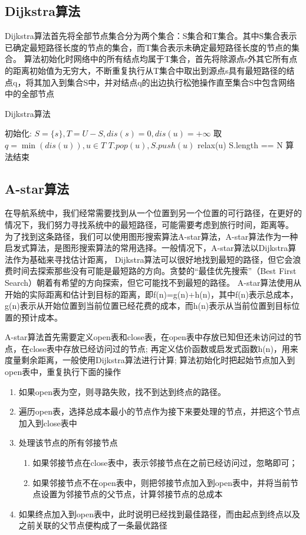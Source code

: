 \subsection*{Dijkstra算法}
Dijkstra算法首先将全部节点集合分为两个集合：S集合和T集合。其中S集合表示已确定最短路径长度的节点的集合，而T集合表示未确定最短路径长度的节点的集合。
算法初始化时网络中的所有结点均属于T集合，首先将除源点s外其它所有点的距离初始值为无穷大，不断重复执行从T集合中取出到源点s具有最短路径的结点q，将其加入到集合S中，并对结点q的出边执行松弛操作直至集合S中包含网络中的全部节点


\begin{algorithm}
    \caption{Dijkstra算法}
    \begin{algorithmic}[1]
        \STATE 初始化: $S = \{s\}, T = U - S, dis(s)=0, dis(u)=+\infty$
        \REPEAT
        \STATE 取$q=\min(dis(u)), u \in T$
        \STATE $T.pop(u), S.push(u)$
        \STATE relax(u)
        \UNTIL S.length == N
        \STATE 算法结束
    \end{algorithmic}\label{alg:algorithm}
\end{algorithm}

\subsection*{A-star算法}
在导航系统中，我们经常需要找到从一个位置到另一个位置的可行路径，在更好的情况下，我们努力寻找系统中的最短路径，可能需要考虑到旅行时间，距离等。
为了找到这条路径，我们可以使用图形搜索算法A-star算法，A-star算法作为一种启发式算法，是图形搜索算法的常用选择。一般情况下，A-star算法以Dijkstra算法作为基础来寻找估计距离，
Dijkstra算法可以很好地找到最短的路径，但它会浪费时间去探索那些没有可能是最短路的方向。贪婪的“最佳优先搜索”（Best First Search）朝着有希望的方向探索，但它可能找不到最短的路径。
A-star算法使用从开始的实际距离和估计到目标的距离，即f(n)=g(n)+h(n)，其中f(n)表示总成本，g(n)表示从开始位置到当前位置已经花费的成本，而h(n)表示从当前位置到目标位置的预计成本。

A-star算法首先需要定义open表和close表，在open表中存放已知但还未访问过的节点，在close表中存放已经访问过的节点;
再定义估价函数或启发式函数h(n)，用来度量剩余距离，一般使用Dijkstra算法进行计算;
算法初始化时把起始节点加入到open表中，重复执行下面的操作
\begin{enumerate}%
    \item 如果open表为空，则寻路失败，找不到达到终点的路径。
    \item 遍历open表，选择总成本最小的节点作为接下来要处理的节点，并把这个节点加入到close表中
    \item 处理该节点的所有邻接节点
    \begin{enumerate}%
        \item 如果邻接节点在close表中，表示邻接节点在之前已经访问过，忽略即可；
        \item 如果邻接节点不在open表中，则把邻接节点加入到open表中，并将当前节点设置为邻接节点的父节点，计算邻接节点的总成本
    \end{enumerate}
    \item 如果终点加入到open表中，此时说明已经找到最佳路径，而由起点到终点以及之前关联的父节点便构成了一条最优路径
\end{enumerate}

